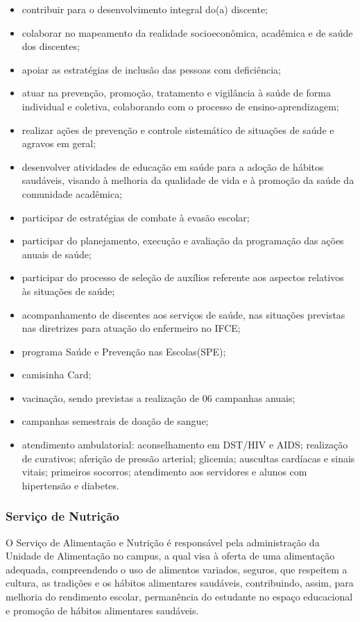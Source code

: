 \documentclass{paper}
\begin{document}
\begin{itemize}
\item contribuir para o desenvolvimento integral do(a) discente; 
\item colaborar no mapeamento da realidade socioeconômica, acadêmica e de saúde dos discentes; 
\item apoiar as estratégias de inclusão das pessoas com deficiência;
\item atuar na prevenção, promoção, tratamento e vigilância à saúde de forma individual e coletiva, colaborando com o processo de ensino-aprendizagem; 
\item realizar ações de prevenção e controle sistemático de situações de saúde e agravos em geral; 
\item desenvolver atividades de educação em saúde para a adoção de hábitos saudáveis, visando à melhoria da qualidade de vida e à promoção da saúde da comunidade acadêmica; 
\item participar de estratégias de combate à evasão escolar; 
\item participar do planejamento, execução e avaliação da programação das ações anuais de saúde; 
\item participar do processo de seleção de auxílios referente aos aspectos relativos às situações de saúde;
\item acompanhamento de discentes aos serviços de saúde, nas situações previstas nas diretrizes para atuação do enfermeiro no IFCE;
\item programa Saúde e Prevenção nas Escolas(SPE);
\item camisinha Card;
\item vacinação, sendo previstas a realização de 06 campanhas anuais;
\item campanhas semestrais de doação de sangue;
\item atendimento ambulatorial: aconselhamento em DST/HIV e AIDS; realização de curativos; aferição de pressão arterial; glicemia; auscultas cardíacas e sinais vitais; primeiros socorros; atendimento aos servidores e alunos com hipertensão e
diabetes.
\end{itemize}

\subsubsection{Serviço de Nutrição} 

O Serviço de Alimentação e Nutrição é responsável pela administração da Unidade de Alimentação no campus, a qual visa à oferta de uma alimentação adequada, compreendendo o uso de alimentos variados, seguros, que respeitem a cultura, as tradições e os hábitos alimentares saudáveis, contribuindo, assim, para melhoria do rendimento escolar, permanência do estudante no espaço educacional e promoção de hábitos alimentares saudáveis.
\end{document}
